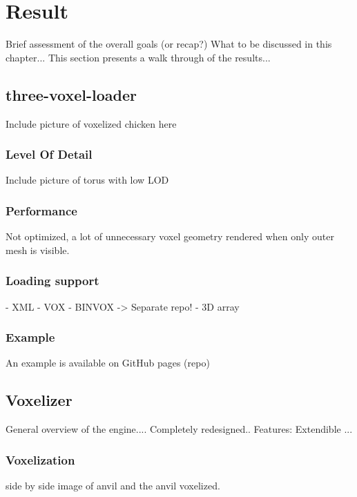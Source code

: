 \chapter{Result}

Brief assessment of the overall goals (or recap?) What to be discussed in this chapter...
This section presents a walk through of the results...

\section{three-voxel-loader}
Include picture of voxelized chicken here
\subsection{Level Of Detail}
Include picture of torus with low LOD
\subsection{Performance}
Not optimized, a lot of unnecessary voxel geometry rendered when only outer mesh is visible.
\subsection{Loading support}
- XML
- VOX
- BINVOX -> Separate repo!
- 3D array

\subsection{Example}
An example is available on GitHub pages (repo)

\section{Voxelizer}
General overview of the engine.... Completely redesigned.. Features: Extendible ...
\subsection{Voxelization}

side by side image of anvil and the anvil voxelized.

